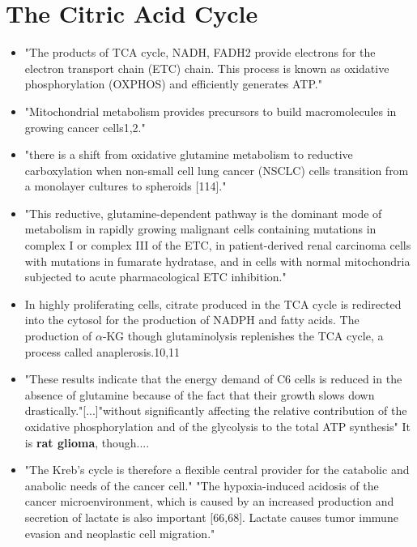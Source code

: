 \documentclass[11pt,a4paper]{article}
\begin{document}
\section{The Citric Acid Cycle}
\begin{itemize}
\item "The products of TCA cycle, NADH, FADH2 provide electrons for the electron transport chain (ETC) chain. This process is known as oxidative phosphorylation (OXPHOS) and efficiently generates ATP."\cite{Mudassar2020}
\item "Mitochondrial metabolism provides precursors to build macromolecules in growing cancer cells1,2." \cite{Mullen2011} 
\item "there is a shift from oxidative glutamine metabolism to reductive carboxylation when non-small cell lung cancer (NSCLC) cells transition from a monolayer cultures to spheroids [114]." \cite{Natarajan2019}\cite{Jiang2016}
\item "This reductive, glutamine-dependent pathway is the dominant mode of metabolism in rapidly growing malignant cells containing mutations in complex I or complex III of the ETC, in patient-derived renal carcinoma cells with mutations in fumarate hydratase, and in cells with normal mitochondria subjected to acute pharmacological ETC inhibition." \cite{Mullen2011}
\item  In highly proliferating cells, citrate produced in the TCA cycle is redirected into the cytosol for the production of
NADPH and fatty acids. The production of $\alpha$-KG though glutaminolysis replenishes
the TCA cycle, a process called anaplerosis.10,11 \cite{Villar2015}
\item  "These results indicate that the energy demand of C6 cells is reduced in the absence of glutamine because of the fact that their growth slows down drastically."[...]"without significantly affecting the relative contribution of the oxidative phosphorylation and of the glycolysis to the total ATP synthesis" It  is \textbf{rat glioma}, though....\cite{Martin1999}
\item "The Kreb's cycle is therefore a flexible central provider for the catabolic and anabolic needs of the cancer cell."\cite{Strickland2017}
"The hypoxia-induced acidosis of the cancer microenvironment, which is caused by an increased production and secretion of lactate is also important [66,68]. Lactate causes tumor immune evasion and neoplastic cell migration."\cite{Korbecki2021}
\end{itemize}
\end{document}
